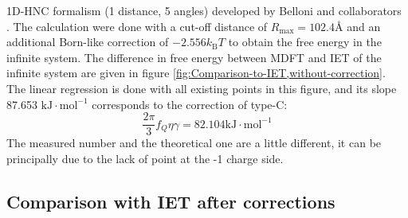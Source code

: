 1D-HNC formalism (1 distance, 5 angles) developed by Belloni and collaborators
\citep{belloni_efficient_2014}. The calculation were done with a
cut-off distance of $R_{\max}=102.4\textrm{Å}$ and an additional
Born-like correction of $-2.556k_{\mathrm{B}}T$ to obtain the free
energy in the infinite system. The difference in free energy between
\acs{MDFT} and \acs{IET} of the infinite system are given in figure
\ref{fig:Comparison-to-IET,without-correction}. The linear regression
is done with all existing points in this figure, and its slope 87.653
$\mathrm{kJ}\cdot\mathrm{mol^{-1}}$ corresponds to the correction
of type-C:
\begin{equation}
\dfrac{2\pi}{3}f_{Q}\eta\gamma=82.104\mathrm{kJ}\cdot\mathrm{mol^{-1}}\label{eq:eta-gamma}
\end{equation}
The measured number and the theoretical one are a little different,
it can be principally due to the lack of point at the -1 charge side.

\subsection{Comparison with IET after corrections}

